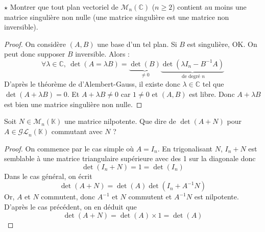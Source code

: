 \documentclass[french,a4paper]{article}
\newcommand{\C}{\mathbb{C}}
\newcommand{\K}{\mathbb{K}}
\newcommand{\inv}{^{-1}}
\theoremstyle{plain}
\theoremstyle{definition}
\theoremstyle{remark}
\begin{document}
\begin{ex}{$\star$}
	Montrer que tout plan vectoriel de $\mathcal{M}_n(\C)$ ($n\geqslant 2$) contient au moins une matrice singulière non nulle (une matrice singulière est une matrice non inversible).
\end{ex}
\begin{proof}
	On considère $(A,B)$ une base d'un tel plan. Si $B$ est singulière, OK. On peut donc supposer $B$ inversible. Alors : $$\forall\lambda\in\C,\ \det(A=\lambda B)=\underbrace{\det(B)}_{\ne 0}\underbrace{\det(\lambda I_n-B\inv A)}_{\text{ de degré }n}$$ D'après le théorème de d'Alembert-Gauss, il existe donc $\lambda\in\C$ tel que $\det(A+\lambda B)=0$. Et $A+\lambda B\ne 0$ car $1\ne 0$ et $(A,B)$ est libre. Donc $A+\lambda B$ est bien une matrice singulière non nulle.
\end{proof}

\begin{ex}{}
	Soit $N\in\mathcal{M}_n(\K)$ une matrice nilpotente. Que dire de $\det(A+N)$ pour $A\in\mathcal{GL}_n(\K)$ commutant avec $N$ ?
\end{ex}
\begin{proof}
	On commence par le cas simple où $A=I_n$. En trigonalisant $N$, $I_n+N$ est semblable à une matrice triangulaire supérieure avec des 1 sur la diagonale donc $$\det(I_n+N)=1=\det(I_n)$$ Dans le cas général, on écrit $$\det(A+N)=\det(A)\det(I_n+A\inv N)$$ Or, $A$ et $N$ commutent, donc $A\inv$ et $N$ commutent et $A\inv N$ est nilpotente. D'après le cas précédent, on en déduit que $$\det(A+N)=\det(A)\times 1=\det(A)$$ 
\end{proof}
\end{document}
